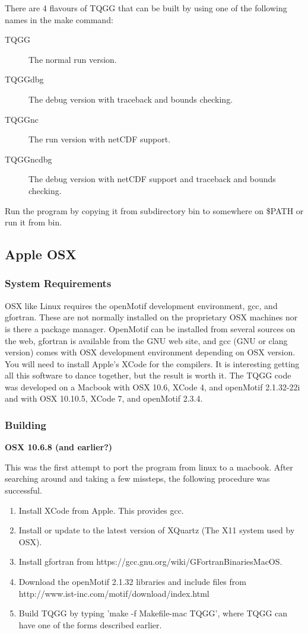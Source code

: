 \documentclass{article}
\begin{document}
There are 4 flavours of TQGG that can be built by using one of the following names in the make command:
\begin{description}
 \item [TQGG] The normal run version.
 \item [TQGGdbg] The debug version with traceback and bounds checking.
 \item [TQGGnc] The run version with netCDF support.
 \item [TQGGncdbg] The debug version with netCDF support and traceback and bounds checking.
\end{description}

Run the program by copying it from subdirectory bin to somewhere on \$PATH or run it from bin. 

\subsection{Apple OSX}
\subsubsection{System Requirements}
OSX like Linux requires the openMotif development environment, gcc, and gfortran. These are
not normally installed on the proprietary OSX machines nor is there a package manager. 
OpenMotif can be installed from several
sources on the web, gfortran is available from the GNU web site, and gcc (GNU or clang version) 
comes with OSX development environment depending on OSX version. You will need to install
Apple's XCode for the compilers. It is interesting getting all this software to dance together,
but the result is worth it. The TQGG code was developed on a Macbook with OSX 10.6,
XCode 4, and openMotif 2.1.32-22i and with OSX 10.10.5, XCode 7, and openMotif 2.3.4.

\subsubsection{Building}

 {\bf{OSX 10.6.8 (and earlier?)}}

This was the first attempt to port the program from linux to a macbook. After searching around
and taking a few missteps, the following procedure was successful.

\begin{enumerate}
 \item Install XCode from Apple. This provides gcc.
 \item Install or update to the latest version of XQuartz (The X11 system used by OSX). 
 \item Install gfortran from https://gcc.gnu.org/wiki/GFortranBinariesMacOS.
 \item Download the openMotif 2.1.32 libraries and include files from \\
 http://www.ist-inc.com/motif/download/index.html
 \item Build TQGG by typing 'make -f Makefile-mac TQGG', where TQGG can have one of the forms described earlier.
\end{enumerate}
\end{document}
